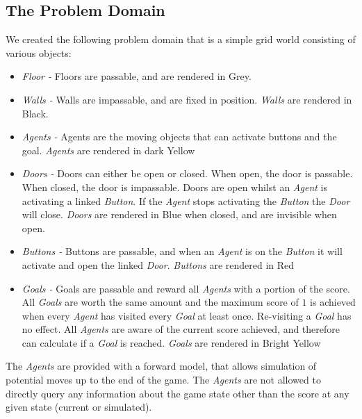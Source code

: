 \documentclass{IEEEtran}
\begin{document}
\subsection{The Problem Domain}
We created the following problem domain that is a simple grid world consisting of various objects:
\begin{itemize}
\item{\emph{Floor - } Floors are passable, and are rendered in Grey.}
\item{\emph{Walls -} Walls are impassable, and are fixed in position. \emph{Walls} are rendered in Black.}
\item{\emph{Agents -} Agents are the moving objects that can activate buttons and the goal. \emph{Agents} are rendered in dark Yellow}
\item{\emph{Doors -} Doors can either be open or closed. When open, the door is passable. When closed, the door is impassable. Doors are open whilst an \emph{Agent} is activating a linked \emph{Button}. If the \emph{Agent} stops activating the \emph{Button} the \emph{Door} will close. \emph{Doors} are rendered in Blue when closed, and are invisible when open.}
\item{\emph{Buttons -} Buttons are passable, and when an \emph{Agent} is on the \emph{Button} it will activate and open the linked \emph{Door}. \emph{Buttons} are rendered in Red}
\item{\emph{Goals -} Goals are passable and reward all \emph{Agents} with a portion of the score. All \emph{Goals} are worth the same amount and the maximum score of $1$ is achieved when every \emph{Agent} has visited every \emph{Goal} at least once. Re-visiting a \emph{Goal} has no effect. All \emph{Agents} are aware of the current score achieved, and therefore can calculate if a \emph{Goal} is reached. \emph{Goals} are rendered in Bright Yellow}
\end{itemize}

The \emph{Agents} are provided with a forward model, that allows simulation of potential moves up to the end of the game. The \emph{Agents} are not allowed to directly query any information about the game state other than the score at any given state (current or simulated).
\end{document}

